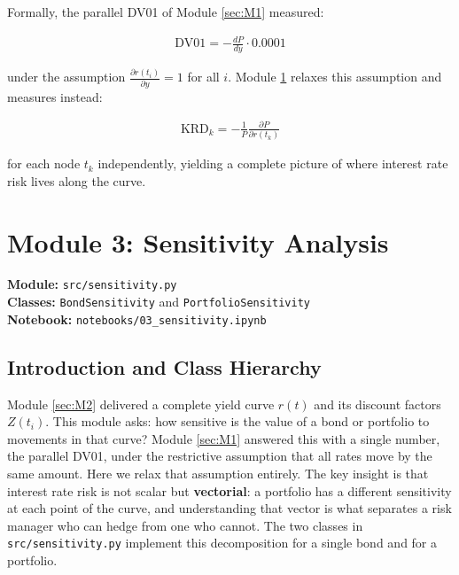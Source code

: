 \documentclass{article}
\theoremstyle{definition}  %
\theoremstyle{plain}  %
\numberwithin{definition}{section}
\numberwithin{proposition}{section}
\numberwithin{theorem}{section}
\numberwithin{equation}{section}
\begin{document}
Formally, the parallel DV01 of Module \ref{sec:M1} 
measured:

\begin{align*}
    \text{DV01} = -\frac{dP}{dy} \cdot 0.0001
\end{align*}

under the assumption $\frac{\partial r(t_i)}
{\partial y} = 1$ for all $i$. Module \ref{sec:M3} 
relaxes this assumption and measures instead:

\begin{align*}
    \text{KRD}_k = -\frac{1}{P}
    \frac{\partial P}{\partial r(t_k)}
\end{align*}

for each node $t_k$ independently, yielding a 
complete picture of where interest rate risk lives 
along the curve.

\newpage

\section{Module 3: Sensitivity Analysis}
\label{sec:M3}

\begin{tcolorbox}[title = Python Implementation, colback = pythonyellow!70!white, colframe = pythonblue]
    \textbf{Module:} \color{magenta} \texttt{src/sensitivity.py} \color{black} \\
    \textbf{Classes:} \color{codegreen} \texttt{BondSensitivity} \color{black} and \color{codegreen} \texttt{PortfolioSensitivity} \color{black} \\
    \textbf{Notebook:} \texttt{notebooks/03\_sensitivity.ipynb}
\end{tcolorbox}

\subsection{Introduction and Class Hierarchy}

Module \ref{sec:M2} delivered a complete yield curve $r(t)$ and its discount factors $Z(t_{i})$. This module asks: how sensitive is the value of a bond or portfolio to movements in that curve? Module \ref{sec:M1} answered this with a single number, the parallel DV01, under the restrictive assumption that all rates move by the same amount. Here we relax that assumption entirely. The key insight is that interest rate risk is not scalar but \textbf{vectorial}: a portfolio has a different sensitivity at each point of the curve, and understanding that vector is what separates a risk manager who can hedge from one who cannot. The two classes in \texttt{src/sensitivity.py} implement this decomposition for a single bond and for a portfolio.
\end{document}
